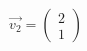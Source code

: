\documentclass[preview]{standalone}
\begin{document}
\begin{align*}
\vec{v_2} = \begin{pmatrix} 2 \\ 1 \end{pmatrix}
\end{align*}
\end{document}
